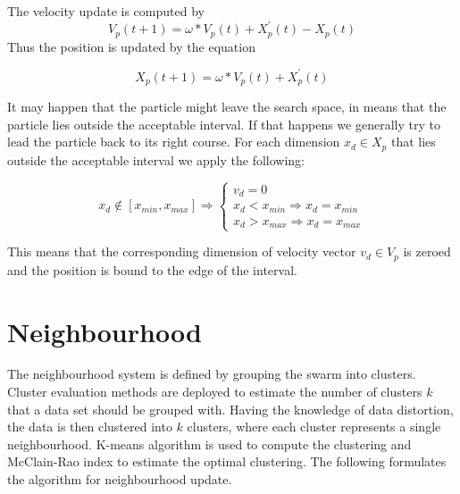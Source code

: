 \documentclass{mini}
\begin{document}
The velocity update is computed by
\begin{equation}
    V_p(t+1) = \omega * V_p(t) + X^{'}_p(t) - X_p(t)
\end{equation}
Thus the position is updated by the equation

\begin{equation}
    X_p(t+1) = \omega * V_p(t) + X^{'}_p(t)
\end{equation}




It may happen that the particle might leave the search space, in means that the particle lies outside the acceptable interval. If that happens we generally try to lead the particle back to its right course. For each dimension $x_{d} \in X_p$ that lies  outside the acceptable interval we apply the following:

\[
x_{d} \notin [x_{min}, x_{max}] \Rightarrow \left \{
\begin{array}{ll}
v_{d} = 0 \\
x_d < x_{min} \Rightarrow x_d = x_{min} \\
x_d > x_{max} \Rightarrow x_d = x_{max}
\end{array}
\right.
\]

This means that the corresponding dimension of velocity vector $v_d \in V_p$ is zeroed and the position is bound to the edge of the interval.


\section{Neighbourhood}
The neighbourhood system is defined by grouping the swarm into clusters. Cluster evaluation methods are deployed to estimate the number of clusters $k$ that a data set should be grouped with. Having the knowledge of data distortion, the data is then clustered into $k$ clusters, where each cluster represents a single neighbourhood. K-means algorithm is used to compute the clustering and McClain-Rao index to estimate the optimal clustering. The following formulates the algorithm for neighbourhood update.
\end{document}

